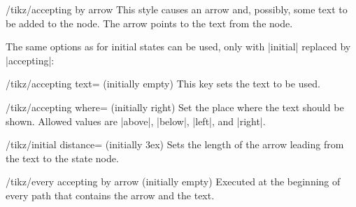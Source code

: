 \begin{stylekey}{/tikz/accepting by arrow}
    This style causes an arrow and, possibly, some text to be added to the
    node. The arrow points to the text from the node.

    The same options as for initial states can be used, only with |initial|
    replaced by |accepting|:
    \begin{key}{/tikz/accepting text= (initially \normalfont empty)}
        This key sets the text to be used.
    \end{key}
    \begin{key}{/tikz/accepting where= (initially right)}
        Set the place where the text should be shown. Allowed values are
        |above|, |below|, |left|, and |right|.
    \end{key}
    \begin{key}{/tikz/initial distance= (initially 3ex)}
        Sets the length of the arrow leading from the text to the state
        node.
    \end{key}
    \begin{stylekey}{/tikz/every accepting by arrow (initially \normalfont empty)}
        Executed at the beginning of every path that contains the arrow and the
        text.
    \end{stylekey}
\begin{codeexample}[preamble={\usetikzlibrary{arrows.meta,automata,positioning}}]
\end{codeexample}
\end{stylekey}

